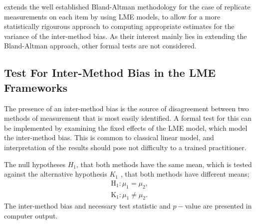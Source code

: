 \documentclass[12pt, a4paper]{report}
\theoremstyle{plain}
\theoremstyle{definition}
\theoremstyle{remark}
\begin{document}
	
	
	
	
	\citet{BXC2008} extends the well established Bland-Altman methodology for the case of replicate measurements on each item by using LME models, to allow for a more statistically rigourous approach to computing appropriate estimates for the variance of the inter-method bias. As their interest mainly lies in extending the Bland-Altman approach, other formal tests are not considered.  
	
	
	
	
	
	\subsection{Test For Inter-Method Bias in the LME Frameworks}
	The presence of an inter-method bias is the source of disagreement between two methods of measurement that is most easily identified. A formal test for this can be implemented by examining the fixed effects of the LME model, which model the inter-method bias. This is common to classical linear model, and interpretation of the results should pose not difficulty to a trained practitioner.
	
	The null hypotheses $H_1$, that both methods have the same mean, which is tested against the alternative hypothesis $K_1$ , that both methods have different means;
	\begin{eqnarray}
	\operatorname{H_1} : \mu_1 = \mu_2 ,\\
	\operatorname{K_1} : \mu_1 \neq \mu_2.
	\end{eqnarray}
	The inter-method bias and necessary test statistic and $p-$value are presented in computer output. 
	
\end{document}
